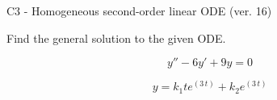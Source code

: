 \begin{exercise}
  \begin{exerciseTitle}C3 - Homogeneous second-order linear ODE (ver. 16)\end{exerciseTitle}
  \begin{exerciseStatement}
    
Find the general solution to the given ODE.

    
\[y''-6y'+9y = 0\]

  \end{exerciseStatement}
  \begin{exerciseAnswer}
    
\[y= k_{1} t e^{\left(3 \, t\right)} + k_{2} e^{\left(3 \, t\right)}\]

  \end{exerciseAnswer}
\end{exercise}